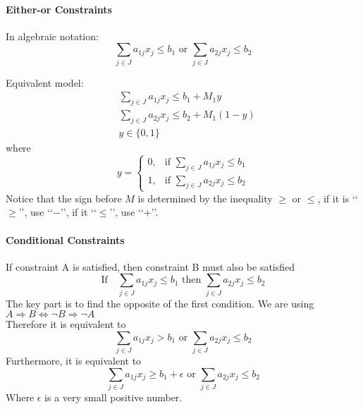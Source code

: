             \paragraph{Either-or Constraints}
                 In algebraic notation: 
                \begin{equation*}
                    \sum_{j\in J} a_{1j} x_j \le b_1 \text{ or } \sum_{j\in J} a_{2j} x_j \le b_2 
                \end{equation*}
                
                Equivalent model:
                \begin{align*}
                    & \sum_{j\in J} a_{1j} x_j \le b_1 + M_1y  \\
                    & \sum_{j\in J} a_{2j} x_j \le b_2 + M_1(1-y)  \\
                    & y \in \{0, 1\} 
                \end{align*}
                where
                \begin{equation*}y=\begin{cases}0, & \text{if }\sum_{j\in J} a_{1j} x_j \le b_1 \\ 1, & \text{if } \sum_{j\in J} a_{2j} x_j \le b_2\end{cases} \end{equation*}
                Notice that the sign before $M$ is determined by the inequality $\ge$ or $\le$, if it is \lq\lq{}$\ge$\rq\rq{}, use \lq\lq{}$-$\rq\rq{}, if it \lq\lq{}$\le$\rq\rq{}, use \lq\lq{}+\rq\rq{}.
            
            \paragraph{Conditional Constraints}
                 If constraint A is satisfied, then constraint B must also be satisfied
                \begin{equation*}
                    \text{If} \quad \sum_{j\in J} a_{1j} x_j \le b_1 \text{ then } \sum_{j\in J} a_{2j} x_j \le b_2 
                \end{equation*}
                The key part is to find the opposite of the first condition. We are using $A\Rightarrow B \Leftrightarrow \neg B \Rightarrow \neg A$\\
                Therefore it is equivalent to
                \begin{equation*}
                    \sum_{j\in J} a_{1j} x_j > b_1 \text{ or } \sum_{j\in J} a_{2j} x_j \le b_2 
                \end{equation*}
                Furthermore, it is equivalent to
                \begin{equation*}
                    \sum_{j\in J} a_{1j} x_j \ge b_1 + \epsilon \text{ or } \sum_{j\in J} a_{2j} x_j \le b_2 
                \end{equation*}
                Where $\epsilon$ is a very small positive number.\\
                
